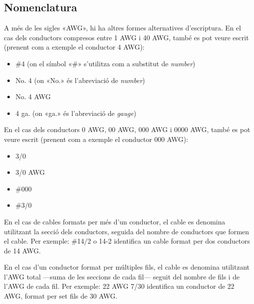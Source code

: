 \subsection{Nomenclatura}

A més de les sigles «AWG», hi ha altres formes alternatives d'escriptura. En el cas dels conductors compresos entre 1 AWG i 40 AWG, també es pot veure escrit (prenent com a exemple el conductor 4 AWG):
\begin{itemize}
   \item \#4 (on el símbol «\#» s'utilitza com a substitut de \textit{number})
   \item No. 4 (on «No.» és l'abreviació de \textit{number})
   \item No. 4 AWG
   \item 4 ga. (on «ga.» és l'abreviació de \textit{gauge})
\end{itemize}

En el cas dels conductors 0 AWG, 00 AWG, 000 AWG i 0000 AWG, també es pot veure escrit (prenent com a exemple el conductor 000 AWG):
\begin{itemize}
   \item 3/0
   \item 3/0 AWG
   \item \#000
   \item \#3/0
\end{itemize}


En el cas de cables formats per més d'un conductor, el cable es denomina utilitzant la secció dels conductors, seguida del nombre de conductors que formen el cable. Per exemple: \#14/2 o 14-2 identifica un cable format per dos conductors de 14 AWG.

En el cas d'un conductor format per múltiples fils, el cable es denomina utilitzant l'AWG total ---suma de les seccions de cada fil--- seguit del nombre de fils i de l'AWG de cada fil. Per exemple: 22 AWG 7/30 identifica un conductor de 22 AWG, format per set fils de  30 AWG.
